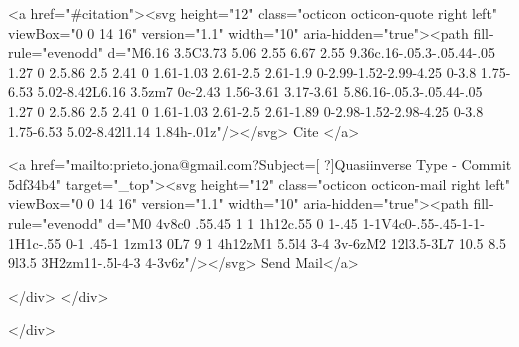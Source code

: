       <a  href="#citation"><svg height="12" class="octicon octicon-quote right left" viewBox="0 0 14 16" version="1.1" width="10" aria-hidden="true"><path fill-rule="evenodd" d="M6.16 3.5C3.73 5.06 2.55 6.67 2.55 9.36c.16-.05.3-.05.44-.05 1.27 0 2.5.86 2.5 2.41 0 1.61-1.03 2.61-2.5 2.61-1.9 0-2.99-1.52-2.99-4.25 0-3.8 1.75-6.53 5.02-8.42L6.16 3.5zm7 0c-2.43 1.56-3.61 3.17-3.61 5.86.16-.05.3-.05.44-.05 1.27 0 2.5.86 2.5 2.41 0 1.61-1.03 2.61-2.5 2.61-1.89 0-2.98-1.52-2.98-4.25 0-3.8 1.75-6.53 5.02-8.42l1.14 1.84h-.01z"/></svg> Cite
      </a>

      <a href="mailto:prieto.jona@gmail.com?Subject=[ ?]Quasiinverse Type - Commit 5df34b4" target="_top"><svg height="12" class="octicon octicon-mail right left" viewBox="0 0 14 16" version="1.1" width="10" aria-hidden="true"><path fill-rule="evenodd" d="M0 4v8c0 .55.45 1 1 1h12c.55 0 1-.45 1-1V4c0-.55-.45-1-1-1H1c-.55 0-1 .45-1 1zm13 0L7 9 1 4h12zM1 5.5l4 3-4 3v-6zM2 12l3.5-3L7 10.5 8.5 9l3.5 3H2zm11-.5l-4-3 4-3v6z"/></svg> Send Mail</a>

    </div>
  </div>

</div>




